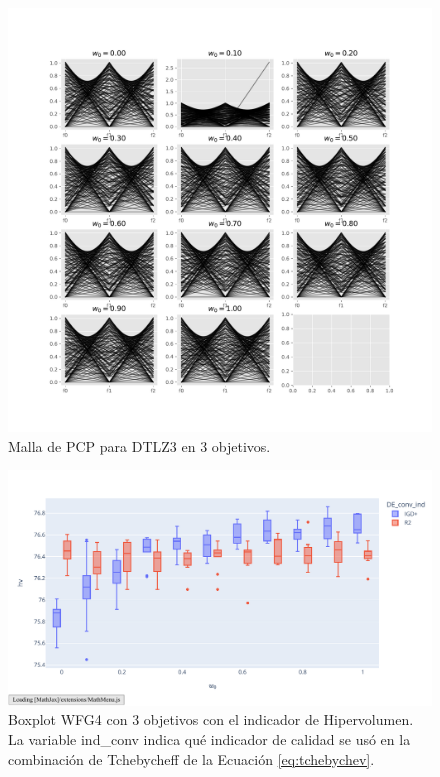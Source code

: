 \begin{figure} [H]
    \centering
    \includegraphics[width=\textwidth]{Figuras/DTLZ3_obj_3_alg_IGD+_indmed_HV_malla._PCP.pdf}
    \caption[Malla de PCP  de aproximaciones al PF.]{Malla de PCP para DTLZ3 en 3 objetivos.}
    \label{fig:PCP}
\end{figure}



\begin{figure} [H]
    \centering
    \includegraphics[width=\textwidth]{Figuras/WFG4_3obj_HV.pdf}
    \caption[Boxplot WFG4 3 Objetivos HV.]{Boxplot WFG4 con 3 objetivos con el indicador de Hipervolumen. La variable ind\_conv indica qué indicador de calidad se usó en la combinación de Tchebycheff de la Ecuación \eqref{eq:tchebychev}.}
    \label{fig:box}
\end{figure}




